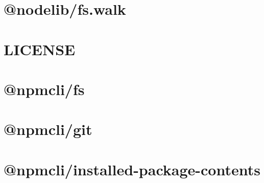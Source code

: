 \documentclass[twoside]{book}
\newcommand{\+}{\discretionary{\mbox{\scriptsize$\hookleftarrow$}}{}{}}
\begin{document}
\chapter{@nodelib/fs.walk}
\label{md__c___users_vaishnavi_jadhav__desktop__developer_code_mean_stack_example_client_node_modules__nodelib_fs_walk__r_e_a_d_m_e}

\chapter{LICENSE}
\label{md__c___users_vaishnavi_jadhav__desktop__developer_code_mean_stack_example_client_node_modules__npmcli_fs__l_i_c_e_n_s_e}

\chapter{@npmcli/fs}
\label{md__c___users_vaishnavi_jadhav__desktop__developer_code_mean_stack_example_client_node_modules__npmcli_fs__r_e_a_d_m_e}

\chapter{@npmcli/git}
\label{md__c___users_vaishnavi_jadhav__desktop__developer_code_mean_stack_example_client_node_modules__npmcli_git__r_e_a_d_m_e}

\chapter{@npmcli/installed-\/package-\/contents}
\label{md__c___users_vaishnavi_jadhav__desktop__developer_code_mean_stack_example_client_node_modules__68acc4cbf22ed39a8f7f99aae37803c1}

\end{document}
